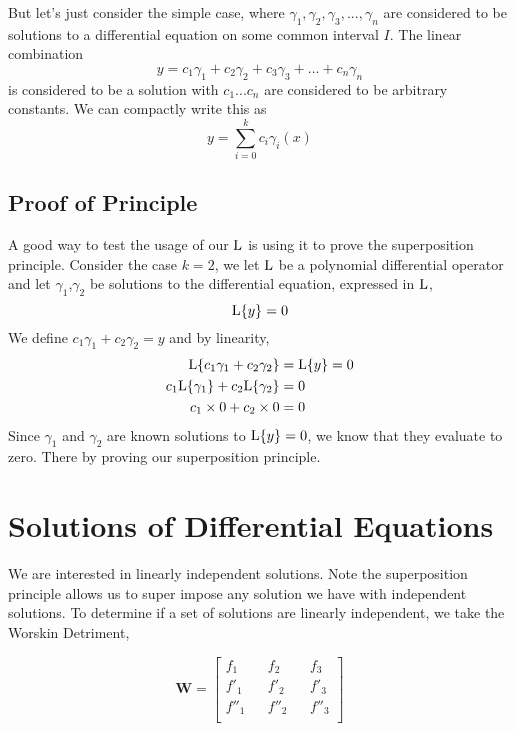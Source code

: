 But let's just consider the simple case, where $\gamma_1, \gamma_2,\gamma_3, ... ,\gamma_n$ are considered to be solutions to a differential equation on some common interval $I$. The linear combination 
\begin{equation*}
	y= c_1\gamma_1 + c_2\gamma_2 + c_3\gamma_3 + ... + c_n\gamma_n
\end{equation*} 
is considered to be a solution with $c_1 ... c_n$ are considered to be arbitrary constants. We can compactly write this as 
\begin{equation*}
	y = \sum_{i=0}^k c_i \gamma_i(x)
\end{equation*}
\subsection{Proof of Principle}
A good way to test the usage of our $\mathrm{L}$ is using it to prove the superposition principle. Consider the case $k=2$, we let $\mathrm{L}$ be a polynomial differential operator and let $\gamma_1$,$\gamma_2$ be solutions to the differential equation, expressed in $\mathrm{L}$,
\begin{equation*}
	\mathrm{L}\{y\}= 0
\end{equation*}
We define $c_1\gamma_1 + c_2\gamma_2 = y$ and by linearity, 
\begin{align*}
	\mathrm{L}\{ c_1\gamma_1 + c_2\gamma_2 \} &= \mathrm{L}\{ y \} = 0 \\ 
	 c_1\mathrm{L}\{\gamma_1\}+ c_2\mathrm{L}\{\gamma_2\} &= 0 \\ 
	 c_1 \times 0 + c_2 \times 0 &= 0   
\end{align*}
Since $\gamma_1$ and $\gamma_2$ are known solutions to $\mathrm{L}\{y\} = 0$, we know that they evaluate to zero. There by proving our superposition principle. 

\section{Solutions of Differential Equations}
We are interested in linearly independent solutions. Note the superposition principle allows us to super impose any solution we have with independent solutions. To determine if a set of solutions are linearly independent, we take the Worskin Detriment,

\begin{equation*}
	\mathbf{W} = \begin{bmatrix}
	    f_1 && f_2  && f_3 \\ 
	    f'_1 && f'_2  && f'_3 \\ 
	    f''_1 && f''_2  && f''_3 \\ 
	\end{bmatrix}
\end{equation*}

